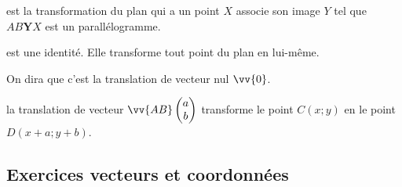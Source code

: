 \documentclass[main.tex]{subfiles}
\begin{document}
\vfill
\begin{definition} est la transformation du plan qui a un point $X$ associe son image $Y$ tel que $AB\textbf{Y}X$ est un parallélogramme.  
\end{definition}
\begin{definition} est une identité. Elle transforme tout point du plan en lui-même. 
	
	On dira que c'est la translation de vecteur nul $\vv{0}$. 
\end{definition} 


\begin{definition} la translation de vecteur $\vv{AB}\begin{pmatrix}
		a\\b
	\end{pmatrix}$ transforme le point $C(x;y)$ en le point $D(x+a; y+b)$.
\end{definition}



%	 



\newpage 
{}  
\pagestyle{scrheadings} %
\onehalfspacing
\subsection{Exercices vecteurs et coordonnées}
\end{document}
